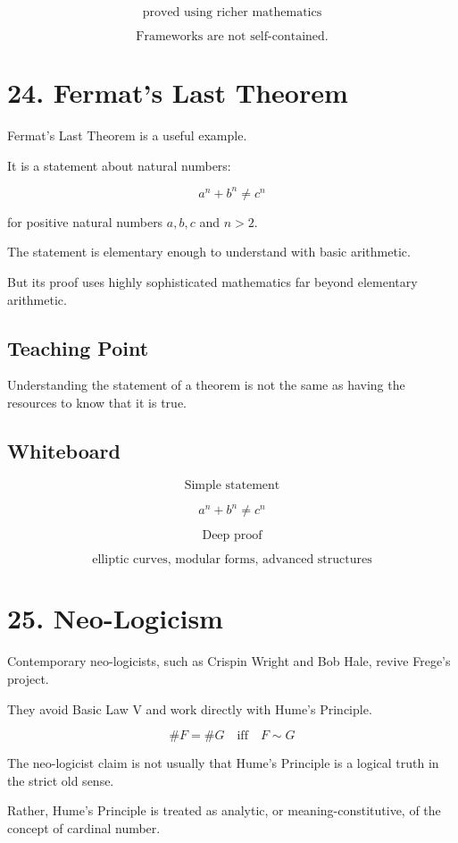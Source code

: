 \documentclass[11pt]{article}
\begin{document}
\[
\text{proved using richer mathematics}
\]

\[
\text{Frameworks are not self-contained.}
\]

\section*{24. Fermat's Last Theorem}

Fermat's Last Theorem is a useful example.

It is a statement about natural numbers:

\[
a^n+b^n \neq c^n
\]

for positive natural numbers \(a,b,c\) and \(n>2\).

The statement is elementary enough to understand with basic arithmetic.

But its proof uses highly sophisticated mathematics far beyond elementary arithmetic.

\subsection*{Teaching Point}

Understanding the statement of a theorem is not the same as having the resources to know
that it is true.

\subsection*{Whiteboard}

\[
\text{Simple statement}
\]

\[
a^n+b^n \neq c^n
\]

\[
\text{Deep proof}
\]

\[
\text{elliptic curves, modular forms, advanced structures}
\]

\section*{25. Neo-Logicism}

Contemporary neo-logicists, such as Crispin Wright and Bob Hale, revive Frege's project.

They avoid Basic Law V and work directly with Hume's Principle.

\[
\boxed{
\#F = \#G
\quad \text{iff}
\quad
F \sim G
}
\]

The neo-logicist claim is not usually that Hume's Principle is a logical truth in the strict
old sense.

Rather, Hume's Principle is treated as analytic, or meaning-constitutive, of the concept of
cardinal number.
\end{document}
